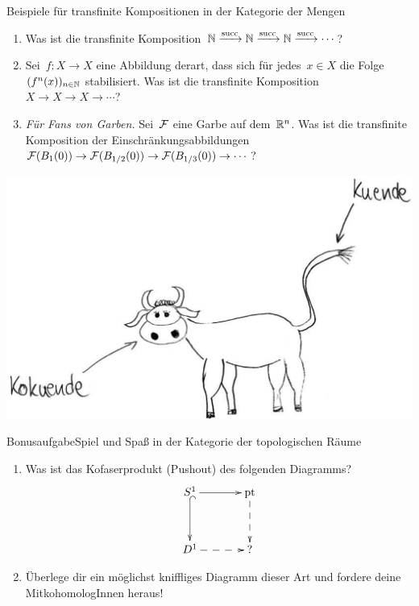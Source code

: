 \documentclass{uebblatt}
\newcommand{\sukk}{\mathrm{succ}}
\begin{document}
\begin{aufgabe}{Beispiele für transfinite Kompositionen in der Kategorie der Mengen}
\begin{enumerate}
\item Was ist die transfinite Komposition~$\NN \xra{\sukk} \NN \xra{\sukk} \NN
\xra{\sukk} \cdots$?
\item Sei~$f : X \to X$ eine Abbildung derart, dass sich für jedes~$x \in X$
die Folge~$(f^n(x))_{n \in \mathbb{N}}$ stabilisiert. Was ist die transfinite
Komposition~$X \to X \to X \to \cdots$?
\item \emph{Für Fans von Garben.} Sei~$\mathcal{F}$ eine Garbe auf dem~$\mathbb{R}^n$. Was ist
die transfinite Komposition der Einschränkungsabbildungen~$\mathcal{F}(B_1(0)) \to
\mathcal{F}(B_{1/2}(0)) \to \mathcal{F}(B_{1/3}(0)) \to \cdots$?
\end{enumerate}
\end{aufgabe}

{\centering
\includegraphics[scale=0.6]{images/kuende}
\par}

\newpage

\begin{aufgabe*}{Bonusaufgabe}{Spiel und Spaß in der Kategorie der topologischen Räume}
\begin{enumerate}
\item Was ist das Kofaserprodukt (Pushout) des folgenden Diagramms?
\[ \xymatrixcolsep{3pc}\xymatrixrowsep{3pc}\xymatrix{
  S^1 \ar[r] \ar@{^{(}->}[d] & \mathrm{pt} \ar@{-->}[d] \\
  D^1 \ar@{-->}[r] & ?
} \]
\item Überlege dir ein möglichst kniffliges Diagramm dieser Art und fordere
deine MitkohomologInnen heraus!
\end{enumerate}
\end{aufgabe*}
\end{document}
